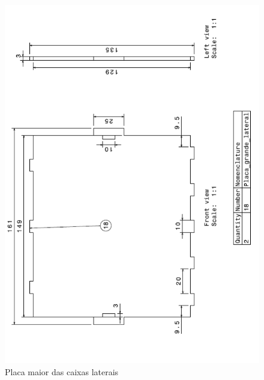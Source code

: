 \begin{anexosenv}
\begin{figure}[!ht]
	\centering
		\includegraphics[scale=0.6]{figuras/estrutura/anexos/7.png}
	\caption{Placa maior das caixas laterais}
\end{figure}


\end{anexosenv}
